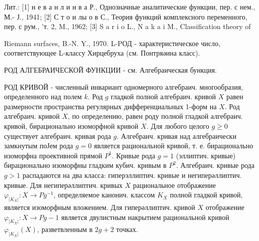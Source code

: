 \documentclass[10pt]{article}
\begin{document}
Лит.: [1] н е в а н л и н в а Р., Однозначные аналитические функции, пер. с нем., М.- Ј., 1941; [2] С т о и лы о в С., Теория функций комплексного переменного, пер. с рум., 'т. 2, M., 1962; [3] S a r i o L., N a k a i M., Classification theory of

Riemann surfaces, B.-N. Y., 1970. L-PОД - характеристическое число, соответствующее L-классу Хирцебруха (см. Понтряәина класс).



РОД АЛГЕБРАИЧЕСКОЙ ФУНКЦИИ - см. Алгебраическая бункция.



РОД КРИВОЙ - численный инвариант одномерного алгебраич. многообразия, определенного над полем $k$. Род $g$ гладкой полной алгебраич. кривой $X$ равен размерности пространства регулярных дифференциальных 1-форм на $X$. Род алгебраич. кривой $X$, по определению, равен роду полной гладкой алгебраич. кривой, бирационально изоморфной кривой $X$. Для любого целого $g \geqslant 0$ существует алгебраич. кривая рода $g$. Алгебраич. кривая над алгебраически замкнутым поЈем рода $g=0$ является рациональной кривой, т. е. бирационально изоморфна проективной прямой $P^{1}$. Кривые рода $g=1$ (эллиптич. кривые) бирационально изоморфны гладким кубич. кривым в $P^{2}$. Алгебраич. кривые рода $g>1$ распадаются на два класса: гиперэллиптич. кривые и негиперәллиптич. кривые. Для негиперәллиптич. кривых $X$ рациональное отображение $\varphi_{\left|K_{X}\right|}: X \rightarrow P g^{-1}$, определяемое канонич. классом $K_{X}$ полной гладкой кривой, является изоморфным вложением. Для гиперәллиптич. кривой $X$ отображение $\varphi_{\left|K_{X}\right|}: X \rightarrow P g-1$ является двулистным накрытием рациональной кривой $\varphi_{\left|K_{X}\right|}(X)$, разветвленным в $2 g+2$ точках.
\end{document}
